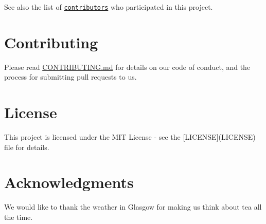 See also the list of \href{https://github.com/GlasgowTeam3RTEP/ExcellenTea/contributors}{\tt contributors} who participated in this project.

\section*{Contributing}

Please read \mbox{\hyperlink{md_CONTRIBUTING}{C\+O\+N\+T\+R\+I\+B\+U\+T\+I\+NG.md}} for details on our code of conduct, and the process for submitting pull requests to us.

\section*{License}

This project is licensed under the M\+IT License -\/ see the \mbox{[}L\+I\+C\+E\+N\+SE\mbox{]}(L\+I\+C\+E\+N\+SE) file for details.

\section*{Acknowledgments}

We would like to thank the weather in Glasgow for making us think about tea all the time. 